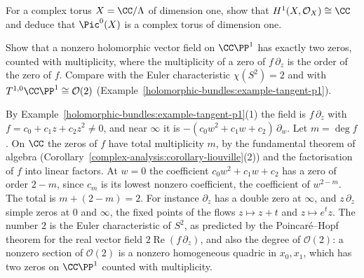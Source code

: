 \begin{exercise}\label{holomorphic-bundles:exercise-picard-torus}
For a complex torus $X = \CC/\Lambda$ of dimension one, show that $H^1(X, \mathcal{O}_X) \cong \CC$ and deduce that $\Pic^0(X)$ is a complex torus of dimension one.
\end{exercise}

\begin{exercise}\label{holomorphic-bundles:exercise-zeros-vector-field}
Show that a nonzero holomorphic vector field on $\CC\PP^1$ has exactly two zeros, counted with multiplicity, where the multiplicity of a zero of $f\,\partial_z$ is the order of the zero of $f$. Compare with the Euler
characteristic $\chi(S^2) = 2$ and with $T^{1,0}\CC\PP^1 \cong \mathcal{O}(2)$ (Example~\ref{holomorphic-bundles:example-tangent-p1}).
\end{exercise}

\begin{solution}
By Example~\ref{holomorphic-bundles:example-tangent-p1}(1) the field is $f\,\partial_z$ with $f = c_0 + c_1z + c_2z^2 \neq 0$, and near $\infty$ it is $-(c_0w^2 + c_1w + c_2)\,\partial_w$. Let $m = \deg f$. On $\CC$ the zeros of $f$
have total multiplicity $m$, by the fundamental theorem of algebra (Corollary~\ref{complex-analysis:corollary-liouville}(2)) and the factorisation of $f$ into linear factors. At $w = 0$ the coefficient
$c_0w^2 + c_1w + c_2$ has a zero of order $2 - m$, since $c_m$ is its lowest nonzero coefficient, the coefficient of $w^{2-m}$. The total is $m + (2 - m) = 2$. For instance $\partial_z$ has a double zero at $\infty$, and
$z\,\partial_z$ simple zeros at $0$ and $\infty$, the fixed points of the flows $z \mapsto z + t$ and $z \mapsto e^tz$. The number $2$ is the Euler characteristic of $S^2$, as predicted by the Poincar\'e--Hopf theorem
for the real vector field $2\operatorname{Re}(f\,\partial_z)$, and also the degree of $\mathcal{O}(2)$: a nonzero section of $\mathcal{O}(2)$ is a nonzero homogeneous quadric in $x_0, x_1$, which has two zeros on
$\CC\PP^1$ counted with multiplicity.
\end{solution}
